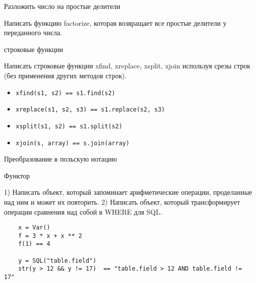 \documentclass{article}
\begin{document}
\begin{center} Разложить число на простые делители \end{center}
Написать функцию factorize, которая возвращает все простые делители
у переданного числа.
\newpage

\begin{center} строковые функции \end{center}
Написать строковые функции xfind, xreplace, xsplit, xjoin используя
срезы строк (без применения других методов строк).
\begin{itemize}
    \item \lstinline!xfind(s1, s2) == s1.find(s2)!
    \item \lstinline!xreplace(s1, s2, s3) == s1.replace(s2, s3)!
    \item \lstinline!xsplit(s1, s2) == s1.split(s2)!
    \item \lstinline!xjoin(s, array) == s.join(array)!
\end{itemize}
\newpage

\begin{center} Преобразование в польскую нотацию \end{center}
\newpage

\begin{center} Функтор \end{center}
1) Написать объект, который запоминает арифметические операции, проделанные над ним 
и может их повторить.
2) Написать объект, который трансформирует операции сравнения над собой в WHERE для SQL.

\begin{lstlisting}
    x = Var()
    f = 3 * x + x ** 2
    f(1) == 4

    y = SQL("table.field")
    str(y > 12 && y != 17)  == "table.field > 12 AND table.field != 17"
\end{lstlisting}
\newpage
\end{document}
